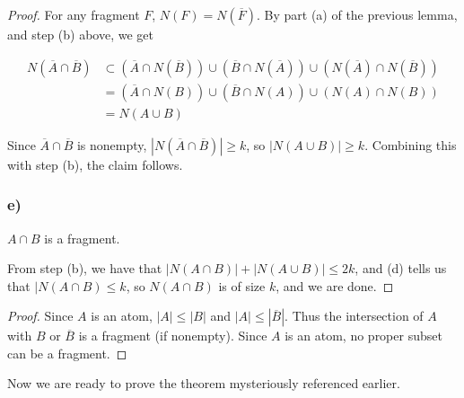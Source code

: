 \begin{proof}
	For any fragment $F$, $N(F)=N(\overline{F})$.  By part (a) of the previous lemma, and step (b) above, we get
	
	\begin{align*}
	N(\overline{A}\cap\overline{B})&\subset (\overline{A}\cap N(\overline{B}))\cup (\overline{B}\cap N(\overline{A}))\cup(N(\overline{A})\cap N(\overline{B}))\\
	&=(\overline{A}\cap N(B))\cup (\overline{B}\cap N(A))\cup (N(A)\cap N(B))\\
	&=N(A\cup B)
	\end{align*}
	
	Since $\overline{A}\cap\overline{B}$ is nonempty, $|N(\overline{A}\cap\overline{B})|\geq k$, so $|N(A\cup B)|\geq k$.  Combining this with step (b), the claim follows.
	
	\subsubsection*{e)}  $A\cap B$ is a fragment.
	
	From step (b), we have that $|N(A\cap B)|+|N(A\cup B)|\leq 2k$, and (d) tells us that $|N(A\cap B)\leq k$, so $N(A\cap B)$ is of size $k$, and we are done. 
	
\end{proof}



\begin{proof}
	Since $A$ is an atom, $|A|\leq |B|$ and $|A|\leq |\overline{B}|$.  Thus the intersection of $A$ with $B$ or $\overline{B}$ is a fragment (if nonempty).  Since $A$ is an atom, no proper subset can be a fragment.
\end{proof}


Now we are ready to prove the theorem mysteriously referenced earlier.


